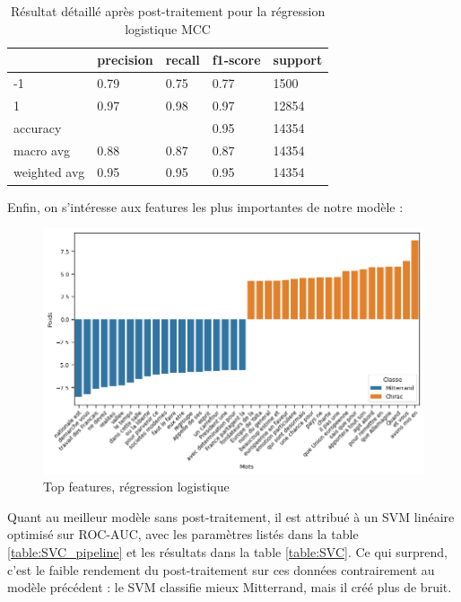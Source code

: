 \documentclass{article}
\begin{document}
\begin{table}[H]
    \centering
    \begin{tabular}{lllll}
        ~ & precision & recall & f1-score & support \\ \hline
        -1 & 0.79 & 0.75 & 0.77 & 1500 \\ 
        1 & 0.97 & 0.98 & 0.97 & 12854 \\ 
        accuracy & ~ & ~ & 0.95 & 14354 \\ 
        macro avg & 0.88 & 0.87 & 0.87 & 14354 \\ 
        weighted avg & 0.95 & 0.95 & 0.95 & 14354 \\ 
    \end{tabular}
    \caption{Résultat détaillé après post-traitement pour la régression logistique MCC}
    \label{table:MMC_with_post}
\end{table}

Enfin, on s'intéresse aux features les plus importantes de notre modèle :

\begin{figure}[H]
    \centering
    \includegraphics[width=\textwidth]{./src/locuteur/param_analysis_MCC.png}
    \caption{Top features, régression logistique}
    \label{features_logreg_mcc}
\end{figure}

Quant au meilleur modèle sans post-traitement, il est attribué à un SVM linéaire optimisé sur ROC-AUC, avec les paramètres listés dans la table \ref{table:SVC_pipeline} et les résultats dans la table \ref{table:SVC}. Ce qui surprend, c'est le faible rendement du post-traitement sur ces données contrairement au modèle précédent : le SVM classifie mieux Mitterrand, mais il créé plus de bruit.
\end{document}
